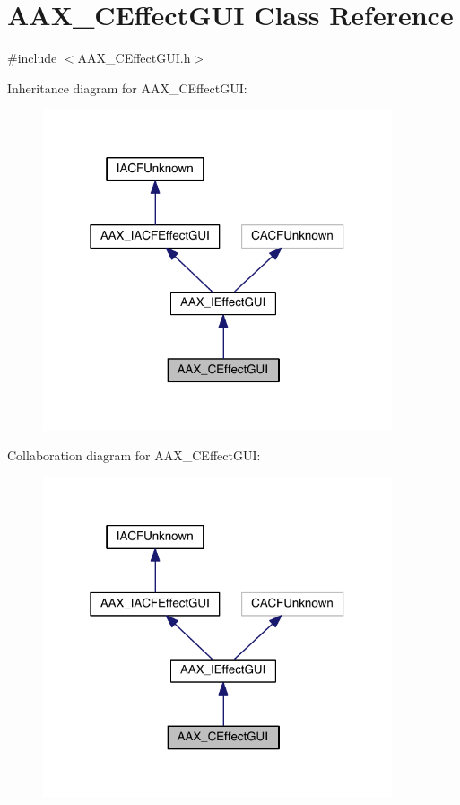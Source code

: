 \hypertarget{a00017}{}\section{A\+A\+X\+\_\+\+C\+Effect\+G\+U\+I Class Reference}
\label{a00017}


{\ttfamily \#include $<$A\+A\+X\+\_\+\+C\+Effect\+G\+U\+I.\+h$>$}



Inheritance diagram for A\+A\+X\+\_\+\+C\+Effect\+G\+U\+I\+:
\nopagebreak
\begin{figure}[H]
\begin{center}
\leavevmode
\includegraphics[width=292pt]{a00414}
\end{center}
\end{figure}


Collaboration diagram for A\+A\+X\+\_\+\+C\+Effect\+G\+U\+I\+:
\nopagebreak
\begin{figure}[H]
\begin{center}
\leavevmode
\includegraphics[width=292pt]{a00415}
\end{center}
\end{figure}


